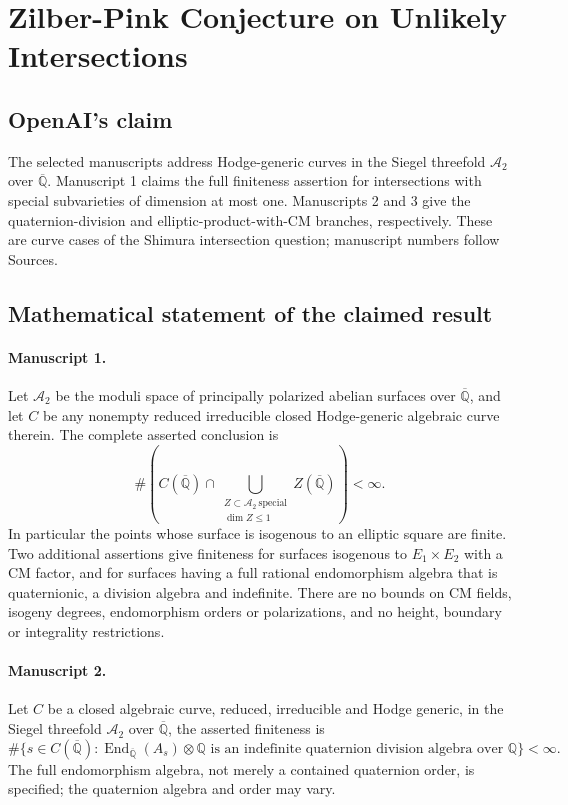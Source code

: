 \documentclass[11pt]{article}
\begin{document}
\section*{Zilber-Pink Conjecture on Unlikely Intersections}

\subsection{OpenAI's claim}
The selected manuscripts address Hodge-generic curves in the Siegel threefold $\mathcal A_2$ over $\overline{\mathbb Q}$. Manuscript 1 claims the full finiteness assertion for intersections with special subvarieties of dimension at most one. Manuscripts 2 and 3 give the quaternion-division and elliptic-product-with-CM branches, respectively. These are curve cases of the Shimura intersection question; manuscript numbers follow Sources.

\subsection{Mathematical statement of the claimed result}
\paragraph{Manuscript 1.}
Let $\mathcal A_2$ be the moduli space of principally polarized abelian surfaces over $\overline{\mathbb Q}$, and let $C$ be any nonempty reduced irreducible closed Hodge-generic algebraic curve therein. The complete asserted conclusion is
\[
 \#\left(C(\overline{\mathbb Q})\cap
 \bigcup_{\substack{Z\subset\mathcal A_2\ \mathrm{special}\\\dim Z\le1}}
 Z(\overline{\mathbb Q})\right)<\infty.
\]
In particular the points whose surface is isogenous to an elliptic square are finite. Two additional assertions give finiteness for surfaces isogenous to $E_1\times E_2$ with a CM factor, and for surfaces having a full rational endomorphism algebra that is quaternionic, a division algebra and indefinite. There are no bounds on CM fields, isogeny degrees, endomorphism orders or polarizations, and no height, boundary or integrality restrictions.

\paragraph{Manuscript 2.}
Let $C$ be a closed algebraic curve, reduced, irreducible and Hodge generic, in the Siegel threefold $\mathcal A_2$ over $\overline{\mathbb Q}$, the asserted finiteness is
\[
 \#\{s\in C(\overline{\mathbb Q}):
 \operatorname{End}_{\overline{\mathbb Q}}(A_s)\otimes\mathbb Q
 \text{ is an indefinite quaternion division algebra over }\mathbb Q\}<\infty.
\]
The full endomorphism algebra, not merely a contained quaternion order, is specified; the quaternion algebra and order may vary.
\end{document}

